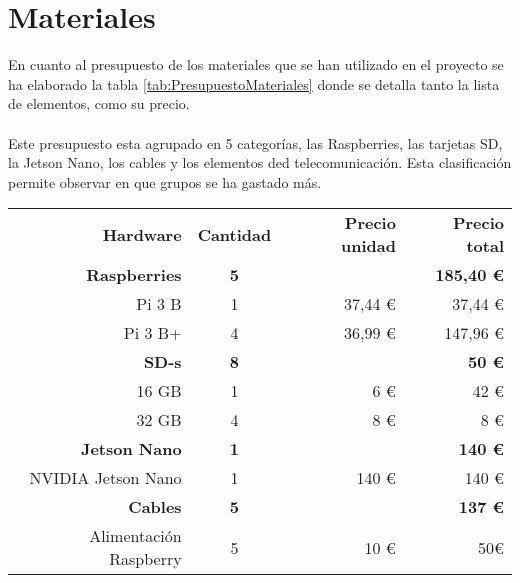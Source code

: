 \newpage
\section{Materiales}
En cuanto al presupuesto de los materiales que se han utilizado en el proyecto se ha elaborado la tabla \ref{tab:PresupuestoMateriales} donde se detalla tanto la lista de elementos, como su precio.
\\ \\
Este presupuesto esta agrupado en 5 categorías, las Raspberries, las tarjetas SD, la Jetson Nano, los cables y los elementos ded telecomunicación. Esta clasificación permite observar en que grupos se ha gastado más. 

\begin{table}[H]
    \begin{center}
        \begin{tabular}{|r|c|r|r|}
            \hline
            \rowcolor{Cyan} 
            \multicolumn{4}{|c|}{\textbf{Materiales}}\\
            \hline
            \textbf{Hardware} & \textbf{Cantidad} & \textbf{Precio unidad}& \textbf{Precio total}\\ 
            \hline
            \rowcolor{GrisTabla}
            \textbf{Raspberries} &  \textbf{5} & & \textbf{185,40 \euro}\\
            Pi 3 B & 1 & 37,44 \euro & 37,44 \euro\\
            Pi 3 B+ & 4 & 36,99 \euro & 147,96 \euro\\
            \hline
            \rowcolor{GrisTabla}
            \textbf{SD-s} &  \textbf{8} & & \textbf{50 \euro}\\
            16 GB & 1 & 6 \euro & 42 \euro\\
            32 GB & 4 & 8 \euro & 8 \euro\\
            \hline
            \rowcolor{GrisTabla}
            \textbf{Jetson Nano} & \textbf{1} & & \textbf{140 \euro}\\
            NVIDIA Jetson Nano & 1 & 140 \euro & 140 \euro\\
            \hline
            \rowcolor{GrisTabla}
            \textbf{Cables} &  \textbf{5} & & \textbf{137 \euro}\\
            Alimentación Raspberry & 5 & 10 \euro & 50\euro\\

\end{tabular}
\end{center}
\end{table}

